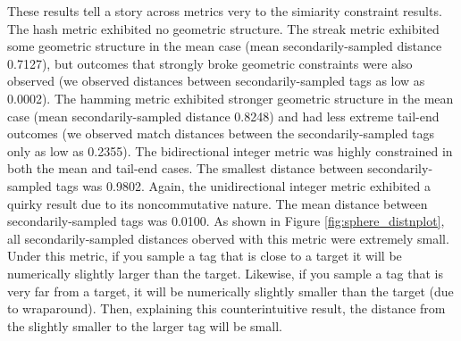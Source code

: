 These results tell a story across metrics very to the simiarity constraint results.
The hash metric exhibited no geometric structure.
The streak metric exhibited some geometric structure in the mean case (mean secondarily-sampled distance 0.7127), but outcomes that strongly broke geometric constraints were also observed (we observed distances between secondarily-sampled tags as low as 0.0002).
The hamming metric exhibited stronger geometric structure in the mean case (mean secondarily-sampled distance 0.8248) and had less extreme tail-end outcomes (we observed match distances between the secondarily-sampled tags only as low as 0.2355).
The bidirectional integer metric was highly constrained in both the mean and tail-end cases.
The smallest distance between secondarily-sampled tags was 0.9802.
Again, the unidirectional integer metric exhibited a quirky result due to its noncommutative nature.
The mean distance between secondarily-sampled tags was 0.0100.
As shown in Figure \ref{fig:sphere_distnplot}, all secondarily-sampled distances oberved with this metric were extremely small.
Under this metric, if you sample a tag that is close to a target it will be numerically slightly larger than the target.
Likewise, if you sample a tag that is very far from a target, it will be numerically slightly smaller than the target (due to wraparound).
Then, explaining this counterintuitive result, the distance from the slightly smaller to the larger tag will be small.

